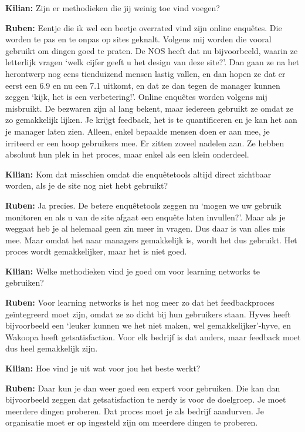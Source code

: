 \textbf{Kilian:} Zijn er methodieken die jij weinig toe vind voegen?

\textbf{Ruben:} Eentje die ik wel een beetje overrated vind zijn online enqu\^etes. Die worden te pas en te onpas op sites geknalt. Volgens mij worden die vooral gebruikt om dingen goed te praten. De NOS heeft dat nu bijvoorbeeld, waarin ze letterlijk vragen `welk cijfer geeft u het design van deze site?'. Dan gaan ze na het herontwerp nog eens tienduizend mensen lastig vallen, en dan hopen ze dat er eerst een 6.9 en nu een 7.1 uitkomt, en dat ze dan tegen de manager kunnen zeggen `kijk, het is een verbetering!'. Online enqu\^etes worden volgens mij misbruikt. De bezwaren zijn al lang bekent, maar iedereen gebruikt ze omdat ze zo gemakkelijk lijken. Je krijgt feedback, het is te quantificeren en je kan het aan je manager laten zien. Alleen, enkel bepaalde mensen doen er aan mee, je irriteerd er een hoop gebruikers mee. Er zitten zoveel nadelen aan. Ze hebben absoluut hun plek in het proces, maar enkel als een klein onderdeel.

\textbf{Kilian:} Kom dat misschien omdat die enqu\^etetools altijd direct zichtbaar worden, als je de site nog niet hebt gebruikt?

\textbf{Ruben:} Ja precies. De betere enqu\^etetools zeggen nu `mogen we uw gebruik monitoren en als u van de site afgaat een enqu\^ete laten invullen?'. Maar als je weggaat heb je al helemaal geen zin meer in vragen. Dus daar is van alles mis mee. Maar omdat het naar managers gemakkelijk is, wordt het dus gebruikt. Het proces wordt gemakkelijker, maar het is niet goed.

\textbf{Kilian:} Welke methodieken vind je goed om voor learning networks te gebruiken?

\textbf{Ruben:} Voor learning networks is het nog meer zo dat het feedbackproces ge\"integreerd moet zijn, omdat ze zo dicht bij hun gebruikers staan. Hyves heeft bijvoorbeeld een `leuker kunnen we het niet maken, wel gemakkelijker'-hyve, en Wakoopa heeft getsatisfaction. Voor elk bedrijf is dat anders, maar feedback moet dus heel gemakkelijk zijn.

\textbf{Kilian:} Hoe vind je uit wat voor jou het beste werkt?

\textbf{Ruben:} Daar kun je dan weer goed een expert voor gebruiken. Die kan dan bijvoorbeeld zeggen dat getsatisfaction te nerdy is voor de doelgroep. Je moet meerdere dingen proberen. Dat proces moet je als bedrijf aandurven. Je organisatie moet er op ingesteld zijn om meerdere dingen te proberen.

